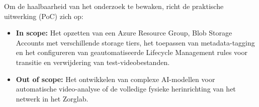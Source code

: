 Om de haalbaarheid van het onderzoek te bewaken, richt de praktische uitwerking (PoC) zich op:
\begin{itemize}
    \item \textbf{In scope:} Het opzetten van een Azure Resource Group, Blob Storage Accounts met verschillende storage tiers, het toepassen van metadata-tagging en het configureren van geautomatiseerde Lifecycle Management rules voor transitie en verwijdering van test-videobestanden.
    \item \textbf{Out of scope:} Het ontwikkelen van complexe AI-modellen voor automatische video-analyse of de volledige fysieke herinrichting van het netwerk in het Zorglab.
\end{itemize}